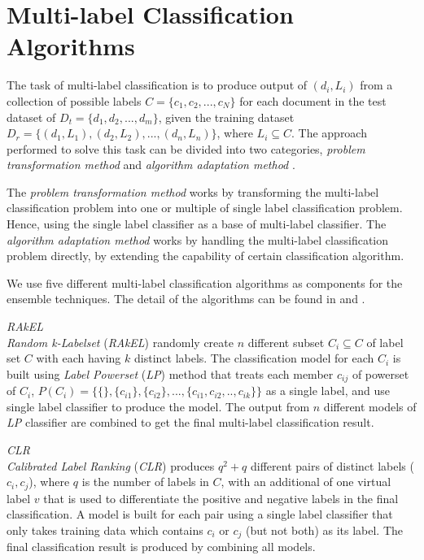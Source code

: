 \section{Multi-label Classification Algorithms}
The task of multi-label classification is to produce output of $(d_{i}, L_{i})$ from a collection of possible labels $C = \{c_{1}, c_{2},...,c_{N}\}$ for each document in the test dataset of $D_{t} = \{d_{1}, d_{2},...,d_{m}\}$, given the training dataset $D_{r} =\{(d_{1},L_{1}),(d_{2},L_{2}),...,(d_{n},L_{n})\}$, where $L_{i} \subseteq C$. The approach performed to solve this task can be divided into two categories, \emph{problem transformation method} and \emph{algorithm adaptation method} \cite{MLCOverview}.

The \emph{problem transformation method} works by transforming the multi-label classification problem into one or multiple of single label classification problem. Hence, using the single label classifier as a base of multi-label classifier. The \emph{algorithm adaptation method} works by handling the multi-label classification problem directly, by extending the capability of certain classification algorithm.

We use five different multi-label classification algorithms as components for the ensemble techniques. The detail of the algorithms can be found in \cite{MLLChapter} and 	\cite{MLLSlides}.

\emph{RAkEL}\\
\emph{Random k-Labelset} (\emph{RAkEL}) randomly create $n$ different subset $C_{i} \subseteq C$ of label set $C$ with each having $k$ distinct labels. The classification model for each $C_{i}$ is built using \emph{Label Powerset} (\emph{LP}) method that treats each member $c_{ij}$ of powerset of $C_{i}$, $P(C_{i}) = \{\{\},\{c_{i1}\},\{c_{i2}\},...,\{c_{i1},c_{i2},..,c_{ik}\}\}$ as a single label, and use single label classifier to produce the model. The output from $n$ different models of \emph{LP} classifier are combined to get the final multi-label classification result.

\emph{CLR}\\
\emph{Calibrated Label Ranking} (\emph{CLR}) produces $q^{2}+q$ different pairs of distinct labels ($c_{i}, c_{j}$), where $q$ is the number of labels in $C$, with an additional of one virtual label $v$ that is used to differentiate the positive and negative labels in the final classification. A model is built for each pair using a single label classifier that only takes training data which contains $c_{i}$ or $c_{j}$ (but not both) as its label. The final classification result is produced by combining all models.

